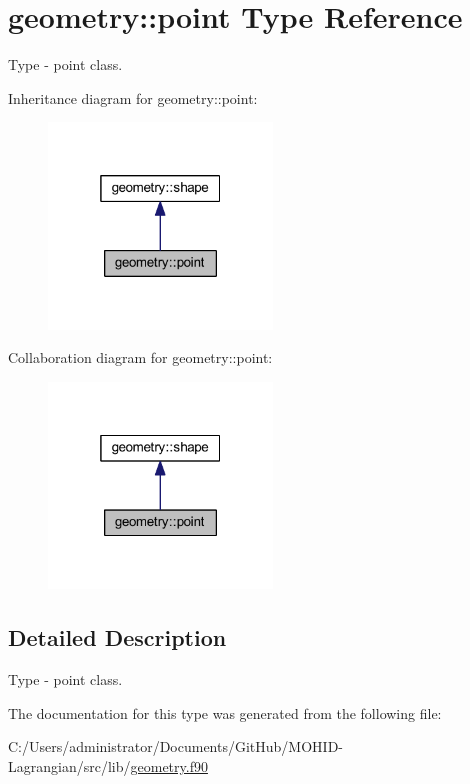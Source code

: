 \hypertarget{structgeometry_1_1point}{}\section{geometry\+:\+:point Type Reference}
\label{structgeometry_1_1point}


Type -\/ point class.  




Inheritance diagram for geometry\+:\+:point\+:\nopagebreak
\begin{figure}[H]
\begin{center}
\leavevmode
\includegraphics[width=169pt]{structgeometry_1_1point__inherit__graph}
\end{center}
\end{figure}


Collaboration diagram for geometry\+:\+:point\+:\nopagebreak
\begin{figure}[H]
\begin{center}
\leavevmode
\includegraphics[width=169pt]{structgeometry_1_1point__coll__graph}
\end{center}
\end{figure}


\subsection{Detailed Description}
Type -\/ point class. 

The documentation for this type was generated from the following file\+:\begin{DoxyCompactItemize}
\item 
C\+:/\+Users/administrator/\+Documents/\+Git\+Hub/\+M\+O\+H\+I\+D-\/\+Lagrangian/src/lib/\hyperlink{geometry_8f90}{geometry.\+f90}\end{DoxyCompactItemize}
